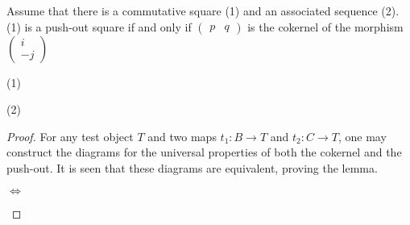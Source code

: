     \begin{lemma}
        Assume that there is a commutative square (1) and an associated sequence (2). (1) is a push-out square if and only if $\begin{pmatrix}
            p & q
        \end{pmatrix}$ is the cokernel of the morphism $\begin{pmatrix}
            i \\ -j
        \end{pmatrix}$
        \begin{center}
            (1)
            \space (2)
        \end{center}
    \end{lemma}

    \begin{proof}
        For any test object $T$ and two maps $t_1:B\rightarrow T$ and $t_2:C\rightarrow T$, one may construct the diagrams for the universal properties of both the cokernel and the push-out. It is seen that these diagrams are equivalent, proving the lemma.
        \begin{center}
            $\Leftrightarrow$
        \end{center}
    \end{proof}

